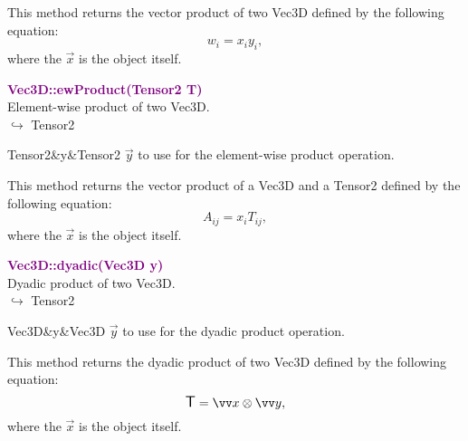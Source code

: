 This method returns the vector product of two Vec3D defined by the following equation:
\begin{equation*}
w_i = x_i y_i,
\end{equation*}
where the $\overrightarrow{x}$ is the object itself.

\textcolor{purple}{\textbf{Vec3D::ewProduct(Tensor2 T)}}\label{Vec3D::ewProduct(Tensor2 T)}\\
Element-wise product of two Vec3D.\\ \hspace*{10mm}$\hookrightarrow$ Tensor2

\begin{tcolorbox}[width=\textwidth,myArgs,tabularx={ll|R}]
Tensor2&y&Tensor2 $\overrightarrow{y}$ to use for the element-wise product operation.
\end{tcolorbox}

This method returns the vector product of a Vec3D and a Tensor2 defined by the following equation:
\begin{equation*}
A_{ij} = x_i T_{ij},
\end{equation*}
where the $\overrightarrow{x}$ is the object itself.

\textcolor{purple}{\textbf{Vec3D::dyadic(Vec3D y)}}\label{Vec3D::dyadic(Vec3D y)}\\
Dyadic product of two Vec3D.\\ \hspace*{10mm}$\hookrightarrow$ Tensor2

\begin{tcolorbox}[width=\textwidth,myArgs,tabularx={ll|R}]
Vec3D&y&Vec3D $\overrightarrow{y}$ to use for the dyadic product operation.
\end{tcolorbox}

This method returns the dyadic product of two Vec3D defined by the following equation:
\begin{equation*}
\T = \overrightarrow{x}\otimes\overrightarrow{y},
\end{equation*}
where the $\overrightarrow{x}$ is the object itself.

